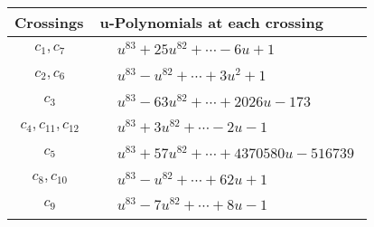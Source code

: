 \documentclass[1p]{elsarticle_modified}
\theoremstyle{definition}
\begin{document}
\begin{tabular}{m{50pt}|m{274pt}}
Crossings & \hspace{64pt}u-Polynomials at each crossing \\
\hline $$\begin{aligned}c_{1},c_{7}\end{aligned}$$&$\begin{aligned}
&u^{83}+25 u^{82}+\cdots-6 u+1
\end{aligned}$\\
\hline $$\begin{aligned}c_{2},c_{6}\end{aligned}$$&$\begin{aligned}
&u^{83}- u^{82}+\cdots+3 u^2+1
\end{aligned}$\\
\hline $$\begin{aligned}c_{3}\end{aligned}$$&$\begin{aligned}
&u^{83}-63 u^{82}+\cdots+2026 u-173
\end{aligned}$\\
\hline $$\begin{aligned}c_{4},c_{11},c_{12}\end{aligned}$$&$\begin{aligned}
&u^{83}+3 u^{82}+\cdots-2 u-1
\end{aligned}$\\
\hline $$\begin{aligned}c_{5}\end{aligned}$$&$\begin{aligned}
&u^{83}+57 u^{82}+\cdots+4370580 u-516739
\end{aligned}$\\
\hline $$\begin{aligned}c_{8},c_{10}\end{aligned}$$&$\begin{aligned}
&u^{83}- u^{82}+\cdots+62 u+1
\end{aligned}$\\
\hline $$\begin{aligned}c_{9}\end{aligned}$$&$\begin{aligned}
&u^{83}-7 u^{82}+\cdots+8 u-1
\end{aligned}$\\
\hline
\end{tabular}\\~\\
\newpage\renewcommand{\arraystretch}{1}
\end{document}
